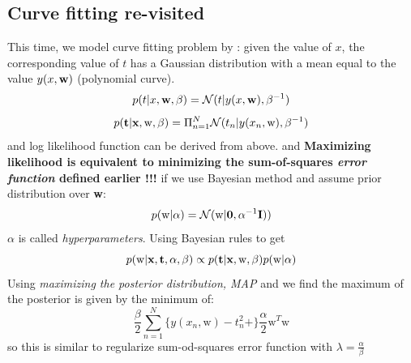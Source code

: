 \documentclass[a4paper]{book}
\begin{document}
\subsection{Curve fitting re-visited}
This time, we model curve fitting problem by : given the value of $x$, the corresponding value of $t$ has a Gaussian distribution with a mean equal to the value $y(x,\textbf w)$ (polynomial curve).
\begin{equation}\label{eq1.9}
  p(t|x,\textbf w,\beta) = \mathcal{N}(t|y(x,\textbf w),\beta^{-1})
\end{equation}
\begin{equation}\label{eq1.10}
  p(\textbf t|\textbf x,\mathrm{w},\beta) = \Pi_{n=1}^N\mathcal N(t_n|y(x_n,\mathrm{w}),\beta^{-1})
\end{equation}
and log likelihood function can be derived from above.  and\textbf{
Maximizing likelihood is equivalent to minimizing the sum-of-squares \emph{error function} defined earlier !!!}\newline
if we use Bayesian method and assume prior distribution over \textbf{w}:
\begin{equation}\label{eq1.5}
  p(\mathrm{w}|\alpha) = \mathcal{N}(\mathrm{w}|\textbf{0},\alpha^{-1}\textbf I) )
\end{equation}
$\alpha$ is called \emph{hyperparameters}. Using Bayesian rules to get
\begin{equation}\label{eq1.6}
  p(\mathrm w|\textbf{x}, \textbf t, \alpha,\beta) \propto p(\textbf t|\textbf x,\mathrm w,\beta)p(\mathrm w|\alpha)
\end{equation}
Using \emph{maximizing the posterior distribution, MAP} and we find the maximum of the posterior is given by the minimum of:
\begin{equation}\label{eq1.7}
 \frac{\beta}2\sum_{n=1}^N\{y(x_n,\mathrm{w})-t_n^2+\}\frac{\alpha}2\mathrm{w}^T\mathrm{w}
\end{equation}
so this is similar to regularize sum-od-squares error function with $\lambda=\frac{\alpha}{\beta}$
\end{document}
